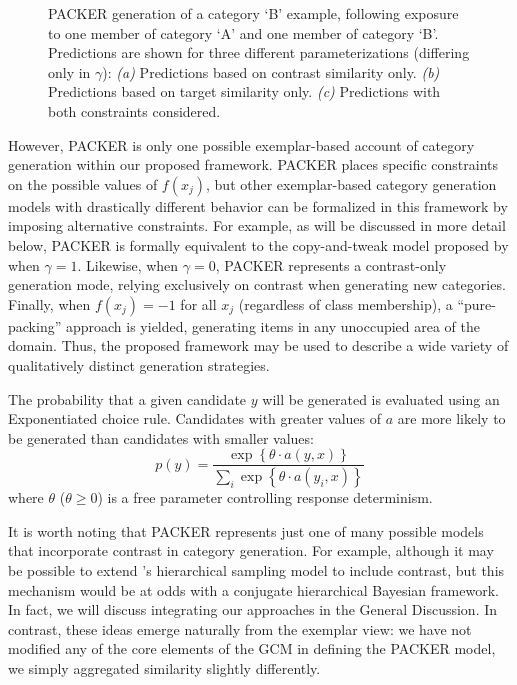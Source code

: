 \documentclass[12pt]{article}
\newcommand\inputpgf[2]{{
\let\pgfimageWithoutPath\pgfimage
\renewcommand{\pgfimage}[2][]{\pgfimageWithoutPath[##1]{#1/##2}}

}}
\begin{document}
\begin{flushleft}
\begin{figure}
	\begin{center}
		\inputpgf{figs/}{packer-examples.pgf}
		\caption{PACKER generation of a category `B' example, following exposure to one member of category `A' and one member of category `B'. Predictions are shown for three different parameterizations (differing only in $\gamma$): \textit{(a)} Predictions based on contrast similarity only. \textit{(b)} Predictions based on target similarity only.  \textit{(c)} Predictions with both constraints considered.}
		\label{fig:packer-examples}
	\end{center}
\end{figure}

However, PACKER is only one possible exemplar-based account of category generation within our proposed framework. PACKER places specific constraints on the possible values of $f(x_j)$, but other exemplar-based category generation models with drastically different behavior can be formalized in this framework by imposing alternative constraints. For example, as will be discussed in more detail below, PACKER is formally equivalent to the copy-and-tweak model proposed by \cite{jern2013probabilistic} when $\gamma = 1$. Likewise, when $\gamma = 0$, PACKER represents a contrast-only generation mode, relying exclusively on contrast when generating new categories. Finally, when $f(x_j) = -1$ for all $x_j$ (regardless of class membership), a ``pure-packing'' approach is yielded, generating items in any unoccupied area of the domain. Thus, the proposed framework may be used to describe a wide variety of qualitatively distinct generation strategies.

The probability that a given candidate $y$ will be generated is evaluated using an Exponentiated \citet{luce1977choice} choice rule. Candidates with greater values of $a$ are more likely to be generated than candidates with smaller values:
% 
\begin{equation}
p(y) = \dfrac
{ \exp  \left \{ \theta \cdot a \left( y, x \right) \right \} } 
{ \sum_i{ \exp  \left \{ \theta \cdot a \left( y_i, x \right) \right\}  } }
\label{eq:packer-choice}
\end{equation}
% 
where $\theta$ ($\theta \geq 0$) is a free parameter controlling response determinism. 

It is worth noting that PACKER represents just one of many possible models that incorporate contrast in category generation. For example, although it may be possible to extend \cite{jern2013probabilistic}'s hierarchical sampling model to include contrast, but this mechanism would be at odds with a conjugate hierarchical Bayesian framework. In fact, we will discuss integrating our approaches in the General Discussion. In contrast, these ideas emerge naturally from the exemplar view: we have not modified any of the core elements of the GCM in defining the PACKER model, we simply aggregated similarity slightly differently. 


\end{flushleft}
\end{document}
